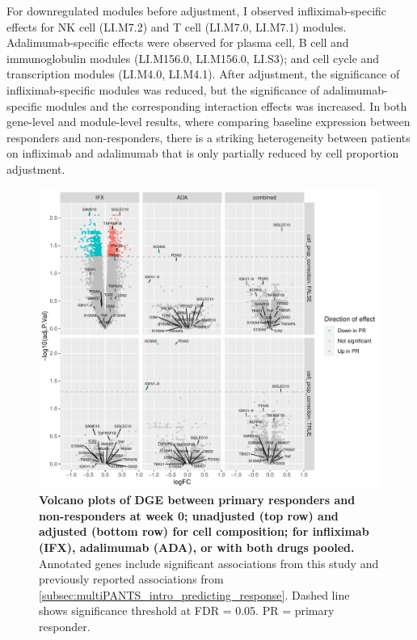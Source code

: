 For downregulated modules before adjustment, I observed infliximab-specific effects for NK cell (LI.M7.2) and T cell (LI.M7.0, LI.M7.1) modules.
Adalimumab-specific effects were observed for plasma cell, B cell and immunoglobulin modules (LI.M156.0, LI.M156.0, LI.S3); and cell cycle and transcription modules (LI.M4.0, LI.M4.1).
After adjustment, the significance of infliximab-specific modules was reduced, 
but the significance of adalimumab-specific modules and the corresponding interaction effects was increased.
In both gene-level and module-level results, where comparing baseline expression between responders and non-responders, there is a striking heterogeneity between patients on infliximab and adalimumab that is only partially reduced by cell proportion adjustment.

\begin{figure}
    \centering
    \includegraphics[width=1.0\textwidth,page=1]{mainmatter/figures/chapter_04/plot_gene_set_enrichment.dge_result_volcano_simple_C_1RI_1NI,C_1RA_1NA,C_1R_1N.pdf}
    \caption{
        \textbf{Volcano plots of \gls{DGE} between primary responders and non-responders at week 0; unadjusted (top row) and adjusted (bottom row) for cell composition; for infliximab (IFX), adalimumab (ADA), or with both drugs pooled.}
        Annotated genes include significant associations from this study and previously reported associations from \autoref{subsec:multiPANTS_intro_predicting_response}.
        Dashed line shows significance threshold at FDR = 0.05.
        PR = primary responder.
    }
    \label{fig:multipants_dge_volcano_week_0_R_N}
\end{figure}

